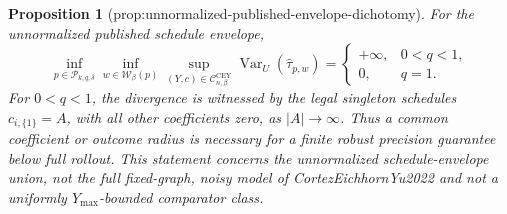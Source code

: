 \documentclass{article}
\newtheorem{proposition}{Proposition}
\begin{document}
\begin{proposition}[prop:unnormalized-published-envelope-dichotomy]\label{prop:unnormalized-published-envelope-dichotomy}
For the unnormalized published schedule envelope,
\[
\inf_{p\in\mathcal P_{k,q,\delta}}
\inf_{w\in\mathcal W_\beta(p)}
\sup_{(Y,c)\in\mathcal C^{\mathrm{CEY}}_{n,\beta}}
\operatorname{Var}_U(\widehat\tau_{p,w})
=
\begin{cases}
+\infty,&0<q<1,\\
0,&q=1.
\end{cases}
\]
For \(0<q<1\), the divergence is witnessed by the legal singleton schedules \(c_{i,\{1\}}=A\), with all other coefficients zero, as \(|A|\to\infty\).  Thus a common coefficient or outcome radius is necessary for a finite robust precision guarantee below full rollout.  This statement concerns the unnormalized schedule-envelope union, not the full fixed-graph, noisy model of CortezEichhornYu2022 and not a uniformly \(Y_{\max}\)-bounded comparator class.
\end{proposition}
\end{document}

